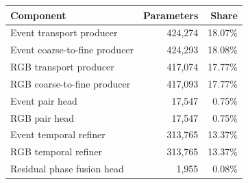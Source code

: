 \begin{tabular}{lrr}
\toprule
Component & Parameters & Share \\
\midrule
Event transport producer & 424,274 & 18.07\% \\
Event coarse-to-fine producer & 424,293 & 18.08\% \\
RGB transport producer & 417,074 & 17.77\% \\
RGB coarse-to-fine producer & 417,093 & 17.77\% \\
Event pair head & 17,547 & 0.75\% \\
RGB pair head & 17,547 & 0.75\% \\
Event temporal refiner & 313,765 & 13.37\% \\
RGB temporal refiner & 313,765 & 13.37\% \\
Residual phase fusion head & 1,955 & 0.08\% \\
\bottomrule
\end{tabular}
